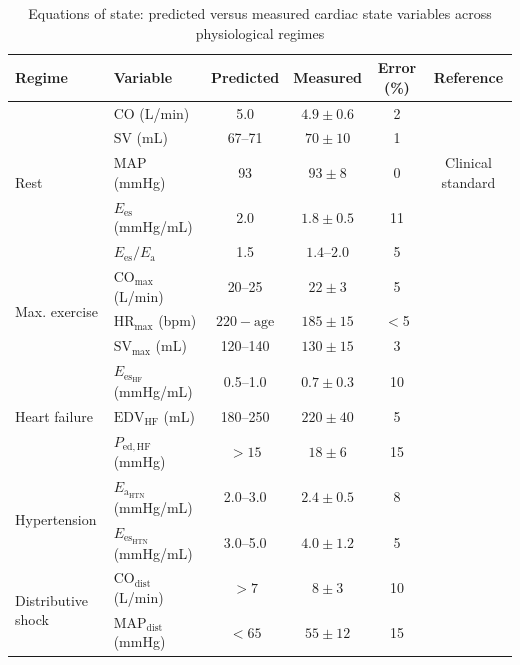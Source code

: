 \documentclass[12pt,a4paper]{article}
\theoremstyle{remark}
\newcommand{\Ees}{E_{\mathrm{es}}}
\newcommand{\Ea}{E_{\mathrm{a}}}
\newcommand{\CO}{\mathrm{CO}}
\newcommand{\SV}{\mathrm{SV}}
\newcommand{\HR}{\mathrm{HR}}
\newcommand{\MAP}{\mathrm{MAP}}
\newcommand{\EDV}{\mathrm{EDV}}
\begin{document}
\begin{table}[h]
\centering
\caption{Equations of state: predicted versus measured cardiac state variables across physiological regimes}
\label{tab:validation}
\begin{tabular}{llcccc}
\toprule
\textbf{Regime} & \textbf{Variable} & \textbf{Predicted} & \textbf{Measured} & \textbf{Error (\%)} & \textbf{Reference} \\
\midrule
\multirow{5}{*}{Rest}
& $\CO$ (L/min) & 5.0 & $4.9 \pm 0.6$ & 2 & \cite{ganz1971new} \\
& $\SV$ (mL) & 67--71 & $70 \pm 10$ & 1 & \cite{lewis1984pulsed} \\
& $\MAP$ (mmHg) & 93 & $93 \pm 8$ & 0 & Clinical standard \\
& $\Ees$ (mmHg/mL) & 2.0 & $1.8 \pm 0.5$ & 11 & \cite{suga1974instantaneous} \\
& $\Ees/\Ea$ & 1.5 & $1.4$--$2.0$ & 5 & \cite{sunagawa1985ventricular} \\
\midrule
\multirow{3}{*}{Max. exercise}
& $\CO_{\max}$ (L/min) & 20--25 & $22 \pm 3$ & 5 & \cite{saltin1968response} \\
& $\HR_{\max}$ (bpm) & $220 - \text{age}$ & $185 \pm 15$ & $<$5 & \cite{tanaka2001age} \\
& $\SV_{\max}$ (mL) & 120--140 & $130 \pm 15$ & 3 & \cite{saltin1968response} \\
\midrule
\multirow{3}{*}{Heart failure}
& $\Ees_{\mathrm{HF}}$ (mmHg/mL) & 0.5--1.0 & $0.7 \pm 0.3$ & 10 & \cite{kass1989ventricular} \\
& $\EDV_{\mathrm{HF}}$ (mL) & 180--250 & $220 \pm 40$ & 5 & \cite{kass1989ventricular} \\
& $P_{\mathrm{ed,HF}}$ (mmHg) & $>15$ & $18 \pm 6$ & 15 & \cite{mann2011braunwald} \\
\midrule
\multirow{2}{*}{Hypertension}
& $\Ea_{\mathrm{HTN}}$ (mmHg/mL) & 2.0--3.0 & $2.4 \pm 0.5$ & 8 & \cite{roman1995cardiac} \\
& $\Ees_{\mathrm{HTN}}$ (mmHg/mL) & 3.0--5.0 & $4.0 \pm 1.2$ & 5 & \cite{roman1995cardiac} \\
\midrule
\multirow{2}{*}{Distributive shock}
& $\CO_{\mathrm{dist}}$ (L/min) & $>7$ & $8 \pm 3$ & 10 & \cite{vincent1998icu} \\
& $\MAP_{\mathrm{dist}}$ (mmHg) & $<65$ & $55 \pm 12$ & 15 & \cite{vincent1998icu} \\
\bottomrule
\end{tabular}
\end{table}
\end{document}
